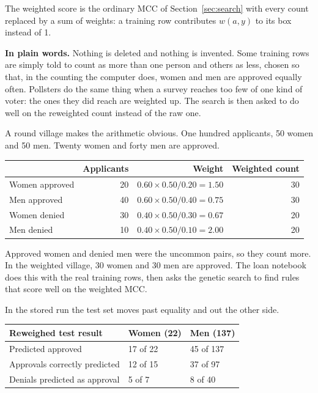 \documentclass[11pt]{article}
\begin{document}
The weighted score is the ordinary MCC of Section~\ref{sec:search} with every count replaced by a sum of weights: a training row contributes \(w(a, y)\) to its box instead of 1.

\begin{plainwords}
\textbf{In plain words.} Nothing is deleted and nothing is invented. Some training rows are simply told to count as more than one person and others as less, chosen so that, in the counting the computer does, women and men are approved equally often. Pollsters do the same thing when a survey reaches too few of one kind of voter: the ones they did reach are weighted up. The search is then asked to do well on the reweighted count instead of the raw one.
\end{plainwords}

A round village makes the arithmetic obvious. One hundred applicants, 50 women and 50 men. Twenty women and forty men are approved.

\begin{table}[H]
\centering
\small
\begin{tabular}{@{}l r r r@{}}
\toprule
 & Applicants & Weight & Weighted count \\
\midrule
Women approved & 20 & \(0.60 \times 0.50 / 0.20 = 1.50\) & 30 \\
Men approved & 40 & \(0.60 \times 0.50 / 0.40 = 0.75\) & 30 \\
Women denied & 30 & \(0.40 \times 0.50 / 0.30 = 0.67\) & 20 \\
Men denied & 10 & \(0.40 \times 0.50 / 0.10 = 2.00\) & 20 \\
\bottomrule
\end{tabular}
\end{table}

\noindent
Approved women and denied men were the uncommon pairs, so they count more. In the weighted village, 30 women and 30 men are approved. The loan notebook does this with the real training rows, then asks the genetic search to find rules that score well on the weighted MCC.

In the stored run the test set moves past equality and out the other side.

\begin{table}[H]
\centering
\small
\begin{tabularx}{\textwidth}{@{}l Y Y@{}}
\toprule
Reweighed test result & Women (22) & Men (137) \\
\midrule
Predicted approved & 17 of 22 & 45 of 137 \\
Approvals correctly predicted & 12 of 15 & 37 of 97 \\
Denials predicted as approval & 5 of 7 & 8 of 40 \\
\bottomrule
\end{tabularx}
\end{table}
\end{document}
